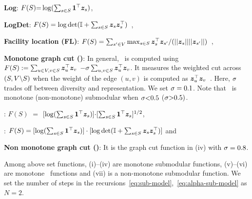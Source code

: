 \documentclass{article}
\renewcommand{\cite}{\citep}
\begin{document}
\begin{enumerate*}[(i)]
\item \textbf{Log}: $F(S) {=} \log (\sum_{s\in S} \bm{1}^\top \bm{z}_s)$,

\item  \textbf{LogDet}: $F(S) = \log \text{det}(\mathbb{I}+\sum_{s\in S}\bm{z}_s \bm{z}_s ^\top)$~\cite{shamaiah2010greedy,borodin2009determinantal},

\item \textbf{Facility location (FL)}: $F(S)= \sum_{s'\in V} \max_{s\in S}  
\bm{z}_s^\top \bm{z}_{s'}/ (||\bm{z}_s|| ||\bm{z}_{s'}||)$~\cite{mirchandani1990discrete,frieze1974cost,du2012primal,ortiz2015multi},

\item \textbf{Monotone graph cut (\gcutm)}: 
In general, \gcut\ is computed using $F(S):= \sum_{u \in V, v \in S} \bm{z}_u ^\top \bm{z}_v $ $  - \sigma \sum_{u, v \in S} \bm{z}_u ^\top \bm{z}_v$. It measures the weighted cut across $(S, V\backslash S)$ when the weight of the edge $(u,v)$ is computed as $\bm{z}_u ^\top \bm{z}_v$~\cite{iyer2021submodular,schrijver2003combinatorial,jegelka2009notes,jegelka2010cooperative,jegelka2011submodularity}. Here, $\sigma$ trades off between diversity and representation. We set $\sigma=0.1$. Note that \gcut\ is monotone (non-monotone) submodular when $\sigma{<}0.5$ ($\sigma{>}0.5)$. 

\item \textbf{\logxsqrt}: $F(S)$ ${=}$ $[\log (\sum_{s\in S} \bm{1}^\top \bm{z}_s)]{\cdot}[\sum_{s \in S} \bm{1}^\top\bm{z}_s]^{1/2}$,

\item \textbf{\logxdet}: $F(S) = [\log (\sum_{s\in S} \bm{1}^\top \bm{z}_s)]\cdot[\log \text{det}(\mathbb{I}+\sum_{s\in S}\bm{z}_s \bm{z}_s ^\top)]$ and

\item \textbf{Non monotone graph cut (\gcutn)}: It is the graph cut function in (iv) with $\sigma=0.8$. 
\end{enumerate*}
%
Among above set functions, (i)--(iv) are monotone submodular functions, (v)--(vi) are monotone \asb\ functions and (vii) is a non-monotone  submodular function. We set the number of steps in the recursions~\eqref{eq:sub-model},~\eqref{eq:alpha-sub-model} as $N=2$.

\end{document}
